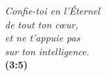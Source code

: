 \newpage
\mbox{}
\vfill


\begin{myverse}
{\itshape
Confie-toi en l'Éternel\\
 de tout ton cœur,\\
et ne t'appuie pas\\ sur ton intelligence.\\[5mm]
}
\myversereffont\bfseries\scshape {}(3:5)
\end{myverse}
\vfill
\mbox{}
\newpage

